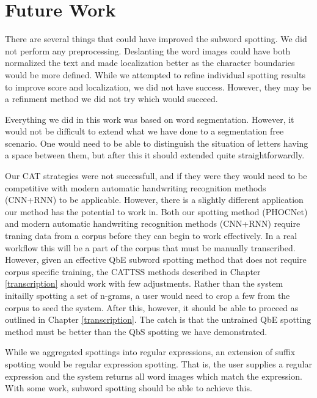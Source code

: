 \documentclass[ms,electronic,twosidetoc,letterpaper,chaptercenter,parttop,lol,lof,lot]{byumsphd}
\begin{document}
\section{Future Work}



There are several things that could have improved the subword spotting. We did not perform any preprocessing. Deslanting the word images could have both normalized the text and made localization better as the character boundaries would be more defined. While we attempted to refine individual spotting results to improve score and localization, we did not have success. However, they may be a refinment method we did not try which would succeed.

Everything we did in this work was based on word segmentation. However, it would not be difficult to extend what we have done to a segmentation free scenario. One would need to be able to distinguish the situation of letters having a space between them, but after this it should extended quite straightforwardly.

Our CAT strategies were not successfull, and if they were they would need to be competitive with modern automatic handwriting recognition methods (CNN+RNN) to be applicable. However, there is a slightly different application our method has the potential to work in.
Both our spotting method (PHOCNet) and modern automatic handwriting recognition methods (CNN+RNN) require traning data from a corpus before they can begin to work effectively. In a real workflow this will be a part of the corpus that must be manually transcribed. However, given an effective QbE subword spotting method that does not require corpus specific training, the CATTSS methods described in Chapter \ref{transcription} should work with few adjustments. Rather than the system initailly spotting a set of n-grams, a user would need to crop a few from the corpus to seed the system. After this, however, it should be able to proceed as outlined in Chapter \ref{transcription}.
The catch is that the untrained QbE spotting method must be better than the QbS spotting we have demonstrated.

While we aggregated spottings into regular expressions, an extension of suffix spotting would be regular expression spotting. That is, the user supplies a regular expression and the system returns all word images which match the expression. With some work, subword spotting should be able to achieve this.




\end{document}
